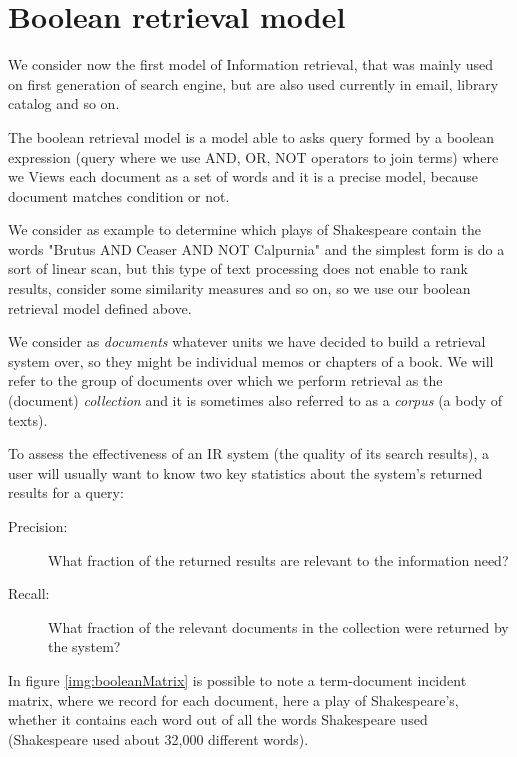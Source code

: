 \section{Boolean retrieval model}
We consider now the first model of Information retrieval, that was mainly used on first generation of search engine,
but are also used currently in email, library catalog and so on.

\begin{defi}
The boolean retrieval model is a model able to asks query formed by a boolean expression (query where we use 
AND, OR, NOT operators to join terms) where we Views each document as a set of words and it is a precise model,
because document matches condition or not.
\end{defi}

We consider as example to determine which plays of Shakespeare contain the words 
"Brutus AND Ceaser AND NOT Calpurnia" and the simplest form is do a sort of linear scan, but this type
of text processing does not enable to rank results, consider some similarity measures and so on, so we use 
our boolean retrieval model defined above.

We consider as \emph{documents} whatever units we have
decided to build a retrieval system over, so they might be individual memos or chapters of a book.\newline
We will refer to the group of documents over which we perform retrieval as the
(document) \emph{collection} and it is sometimes also referred to as a \emph{corpus} (a body of texts).

To assess the effectiveness of an IR system (the quality of its search results), a user will usually want
to know two key statistics about the system’s returned results for a query:
\begin{description}
    \item [Precision: ] What fraction of the returned results are relevant to the information need?
    \item [Recall: ]    What fraction of the relevant documents in the collection were returned by the system?
\end{description}

In figure \ref{img:booleanMatrix} is possible to note a term-document incident matrix, where we 
record for each document, here a play of Shakespeare’s, whether it contains each word 
out of all the words Shakespeare used (Shakespeare used about 32,000 different words).

